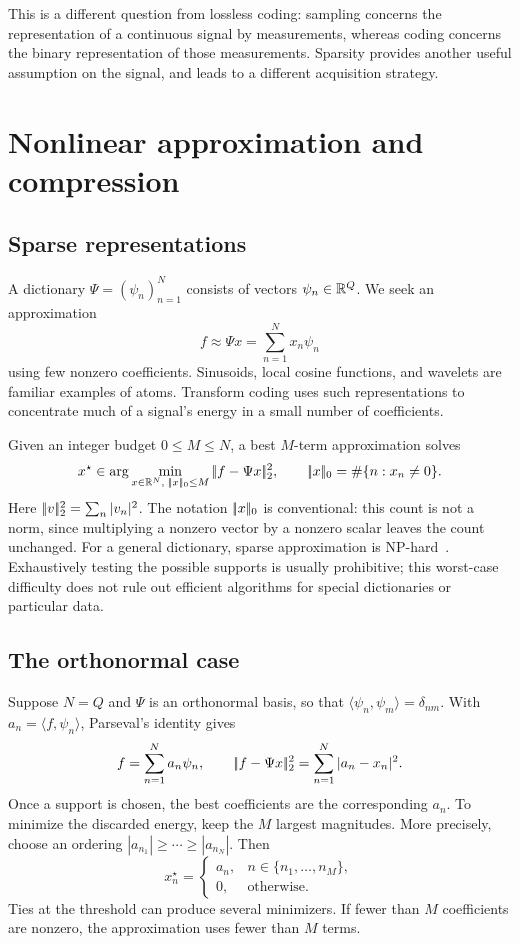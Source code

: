 This is a different question from lossless coding: sampling concerns the representation of a continuous signal by measurements, whereas coding concerns the binary representation of those measurements. Sparsity provides another useful assumption on the signal, and leads to a different acquisition strategy.

\section{Nonlinear approximation and compression}
\subsection{Sparse representations}
A dictionary $\Psi=(\psi_n)_{n=1}^N$ consists of vectors $\psi_n\in\mathbb{R}^Q$. We seek an approximation
\[
 f\approx\Psi x=\sum_{n=1}^N x_n\psi_n
\]
using few nonzero coefficients. Sinusoids, local cosine functions, and wavelets are familiar examples of atoms. Transform coding uses such representations to concentrate much of a signal's energy in a small number of coefficients.

Given an integer budget $0\le M\le N$, a best $M$-term approximation solves
\begin{equation}\label{eq-pbm-approx}
 x^\star\in\arg\min_{x\in\mathbb{R}^N,\;|\!| x |\!|_0\le M}|\!| f-\Psi x |\!|_2^2,
 \qquad |\!| x |\!|_0=\#\{n:x_n\ne0\}.
\end{equation}
Here $|\!| v |\!|_2^2=\sum_n|v_n|^2$. The notation $|\!| x |\!|_0$ is conventional: this count is not a norm, since multiplying a nonzero vector by a nonzero scalar leaves the count unchanged. For a general dictionary, sparse approximation is NP-hard~\cite{Natarajan95}. Exhaustively testing the possible supports is usually prohibitive; this worst-case difficulty does not rule out efficient algorithms for special dictionaries or particular data.

\subsection{The orthonormal case}
Suppose $N=Q$ and $\Psi$ is an orthonormal basis, so that $\langle\psi_n,\psi_m\rangle=\delta_{nm}$. With $a_n=\langle f,\psi_n\rangle$, Parseval's identity gives
\begin{equation}\label{eq-expansion-bon}
 f=\sum_{n=1}^N a_n\psi_n,
 \qquad |\!| f-\Psi x |\!|_2^2=\sum_{n=1}^N|a_n-x_n|^2.
\end{equation}
Once a support is chosen, the best coefficients are the corresponding $a_n$. To minimize the discarded energy, keep the $M$ largest magnitudes. More precisely, choose an ordering $|a_{n_1}|\ge\cdots\ge|a_{n_N}|$. Then
\begin{equation}\label{eq-formule-thresh}
 x_n^\star=\begin{cases}
 a_n,&n\in\{n_1,\ldots,n_M\},\\
 0,&\text{otherwise}.
 \end{cases}
\end{equation}
Ties at the threshold can produce several minimizers. If fewer than $M$ coefficients are nonzero, the approximation uses fewer than $M$ terms.

